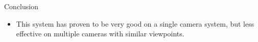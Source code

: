 \documentclass[final]{beamer}
\begin{document}
\begin{frame}{}
\begin{columns}[t]
\begin{column}{.49\linewidth}
\begin{block}{Conclusion}
\begin{itemize}
         \item This system has proven to be very good on a single camera system, but less effective on multiple cameras with similar viewpoints.
        \end{itemize}
        \end{block}

      \end{column}
    \end{columns}
    

  \end{frame}
\end{document}
